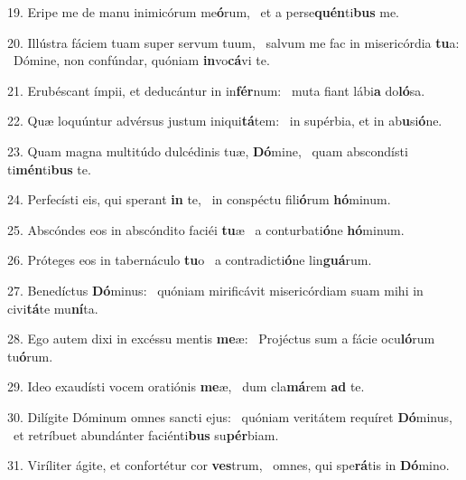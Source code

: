 19. Eripe me de manu inimicórum me\textbf{ó}rum, \ast\  et a perse\textbf{quén}ti\textbf{bus} me.\

20. Illústra fáciem tuam super servum tuum, \dag\  salvum me fac in misericórdia \textbf{tu}a: \ast\  Dómine, non confúndar, quóniam \textbf{in}vo\textbf{cá}vi te.\

21. Erubéscant ímpii, et deducántur in in\textbf{fér}num: \ast\  muta fiant lábi\textbf{a} do\textbf{ló}sa.\

22. Quæ loquúntur advérsus justum iniqui\textbf{tá}tem: \ast\  in supérbia, et in ab\textbf{u}si\textbf{ó}ne.\

23. Quam magna multitúdo dulcédinis tuæ, \textbf{Dó}mine, \ast\  quam abscondísti ti\textbf{mén}ti\textbf{bus} te.\

24. Perfecísti eis, qui sperant \textbf{in} te, \ast\  in conspéctu fili\textbf{ó}rum \textbf{hó}minum.\

25. Abscóndes eos in abscóndito faciéi \textbf{tu}æ \ast\  a conturbati\textbf{ó}ne \textbf{hó}minum.\

26. Próteges eos in tabernáculo \textbf{tu}o \ast\  a contradicti\textbf{ó}ne lin\textbf{guá}rum.\

27. Benedíctus \textbf{Dó}minus: \ast\  quóniam mirificávit misericórdiam suam mihi in civi\textbf{tá}te mu\textbf{ní}ta.\

28. Ego autem dixi in excéssu mentis \textbf{me}æ: \ast\  Projéctus sum a fácie ocu\textbf{ló}rum tu\textbf{ó}rum.\

29. Ideo exaudísti vocem oratiónis \textbf{me}æ, \ast\  dum cla\textbf{má}rem \textbf{ad} te.\

30. Dilígite Dóminum omnes sancti ejus: \dag\  quóniam veritátem requíret \textbf{Dó}minus, \ast\  et retríbuet abundánter faciénti\textbf{bus} su\textbf{pér}biam.\

31. Viríliter ágite, et confortétur cor \textbf{ves}trum, \ast\  omnes, qui spe\textbf{rá}tis in \textbf{Dó}mino.\

